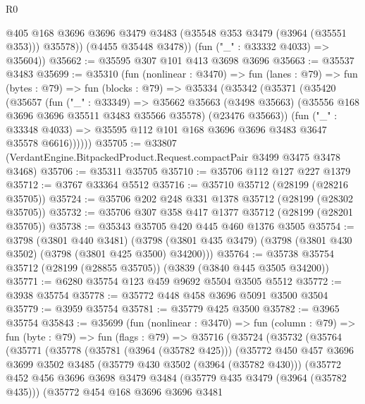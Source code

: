 \begin{lexlean}{R0}
\begin{coremodule}
            @405
            @168
            @3696
            @3696
            @3479
            @3483
            (@35548 @353 @3479 (@3964 (@35551 @353)))
            @35578))
        (@4455 @35448 @3478))
      (fun ("_" : @33332 @4033) => @35604))
@35662 := @35595 @307 @101 @413 @3698 @3696
@35663 := @35537 @3483
@35699 := @35310
    (fun (nonlinear : @3470) =>
    fun (lanes : @79) =>
    fun (bytes : @79) =>
    fun (blocks : @79) =>
    @35334
      (@35342
        (@35371
          (@35420
            (@35657
              (fun ("_" : @33349) =>
              @35662
                @35663
                (@3498 @35663)
                (@35556 @168 @3696 @3696 @35511 @3483 @35566 @35578)
                (@23476 @35663))
              (fun ("_" : @33348 @4033) =>
              @35595 @112 @101 @168 @3696 @3696 @3483 @3647 @35578 @6616))))))
@35705 := @33807 (VerdantEngine.BitpackedProduct.Request.compactPair @3499 @3475 @3478 @3468)
@35706 := @35311 @35705
@35710 := @35706 @112 @127 @227 @1379
@35712 := @3767 @33364 @5512
@35716 := @35710 @35712 (@28199 (@28216 @35705))
@35724 := @35706 @202 @248 @331 @1378 @35712 (@28199 (@28302 @35705))
@35732 := @35706 @307 @358 @417 @1377 @35712 (@28199 (@28201 @35705))
@35738 := @35343 @35705 @420 @445 @460 @1376 @3505
@35754 := @3798
    (@3801 @440 @3481)
    (@3798 (@3801 @435 @3479) (@3798 (@3801 @430 @3502) (@3798 (@3801 @425 @3500) @34200)))
@35764 := @35738 @35754 @35712 (@28199 (@28855 @35705)) (@3839 (@3840 @445 @3505 @34200))
@35771 := @6280 @35754 @123 @459 @9692 @5504 @3505 @5512
@35772 := @3938 @35754
@35778 := @35772 @448 @458 @3696 @5091 @3500 @3504
@35779 := @3959 @35754
@35781 := @35779 @425 @3500
@35782 := @3965 @35754
@35843 := @35699
    (fun (nonlinear : @3470) =>
    fun (column : @79) =>
    fun (byte : @79) =>
    fun (flags : @79) =>
    @35716
      (@35724
        (@35732
          (@35764
            (@35771
              (@35778
                (@35781 (@3964 (@35782 @425)))
                (@35772
                  @450
                  @457
                  @3696
                  @3699
                  @3502
                  @3485
                  (@35779 @430 @3502 (@3964 (@35782 @430)))
                  (@35772
                    @452
                    @456
                    @3696
                    @3698
                    @3479
                    @3484
                    (@35779 @435 @3479 (@3964 (@35782 @435)))
                    (@35772
                      @454
                      @168
                      @3696
                      @3696
                      @3481

\end{coremodule}
\end{lexlean}
